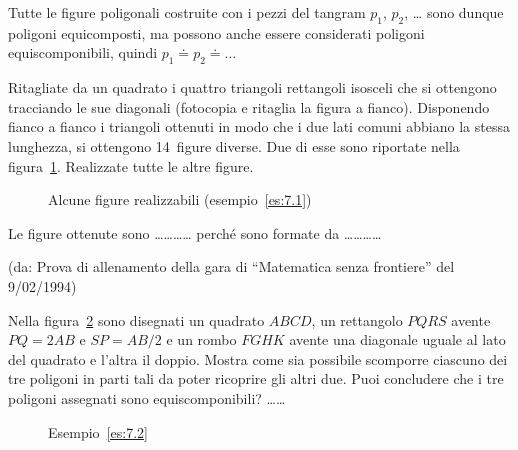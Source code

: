 Tutte le figure poligonali costruite con i pezzi del tangram $p_1$, 
$p_2$, \ldots{} sono dunque poligoni equicomposti, ma possono anche 
essere considerati poligoni equiscomponibili, quindi $p_1 \doteq p_2 
\doteq \ldots{}$

\noindent\begin{minipage}{0.65\textwidth}\parindent15pt
\begin{esempio}\label{es:7.1}
Ritagliate da un quadrato i quattro triangoli rettangoli isosceli che 
si ottengono tracciando le sue diagonali (fotocopia e ritaglia la 
figura a fianco). Disponendo fianco a fianco i triangoli ottenuti in 
modo che i due lati comuni abbiano la stessa lunghezza, si ottengono 
14~figure diverse. Due di esse sono riportate nella 
figura~\ref{fig:quadrato2}. Realizzate tutte le altre figure.
\end{esempio}
\end{minipage}\hfil
\begin{minipage}{0.35\textwidth}
  \centering
\end{minipage}\vspace{5pt}


\begin{inaccessibleblock}
 \begin{figure}[!htb]
\centering
\caption{Alcune figure realizzabili 
(esempio~\ref{es:7.1})}\label{fig:quadrato2}
\end{figure}
\end{inaccessibleblock}

Le figure ottenute sono \ldots\ldots\ldots\ldots{} perché sono 
formate da \ldots\ldots\ldots\ldots{}

\noindent(da: Prova di allenamento della gara di ``Matematica senza 
frontiere'' del 9/02/1994)

\begin{esempio}\label{es:7.2}
Nella figura~\ref{fig:figure} sono disegnati un quadrato $ABCD$, un 
rettangolo $PQRS$ avente $PQ=2AB$ e $SP=AB/2$ e un rombo $FGHK$ 
avente una diagonale uguale al lato del quadrato e l'altra il doppio. 
Mostra come sia possibile scomporre ciascuno dei tre poligoni in parti 
tali da poter ricoprire gli altri due. Puoi concludere che i tre 
poligoni assegnati sono equiscomponibili? \ldots\ldots{}


\begin{inaccessibleblock}
 \begin{figure}[!htb]
  \centering
  \caption{Esempio~\ref{es:7.2}}\label{fig:figure}
\end{figure}
\end{inaccessibleblock}

\end{esempio}


